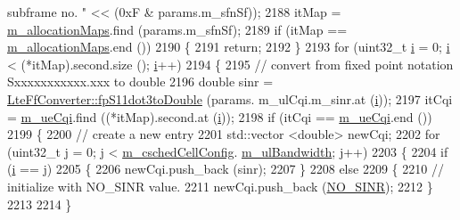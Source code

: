 \begin{DoxyCode}
{       subframe no. "} << (0xF & params.m\_sfnSf));
2188         itMap = \hyperlink{classns3_1_1FdTbfqFfMacScheduler_a5f22054304388f5f9469e3591b3bedea}{m\_allocationMaps}.find (params.m\_sfnSf);
2189         \textcolor{keywordflow}{if} (itMap == \hyperlink{classns3_1_1FdTbfqFfMacScheduler_a5f22054304388f5f9469e3591b3bedea}{m\_allocationMaps}.end ())
2190           \{
2191             \textcolor{keywordflow}{return};
2192           \}
2193         \textcolor{keywordflow}{for} (uint32\_t \hyperlink{bernuolliDistribution_8m_a6f6ccfcf58b31cb6412107d9d5281426}{i} = 0; \hyperlink{bernuolliDistribution_8m_a6f6ccfcf58b31cb6412107d9d5281426}{i} < (*itMap).second.size (); \hyperlink{bernuolliDistribution_8m_a6f6ccfcf58b31cb6412107d9d5281426}{i}++)
2194           \{
2195             \textcolor{comment}{// convert from fixed point notation Sxxxxxxxxxxx.xxx to double}
2196             \textcolor{keywordtype}{double} sinr = \hyperlink{classns3_1_1LteFfConverter_aa5d8c2a8f988dbd63da91818c18666eb}{LteFfConverter::fpS11dot3toDouble} (params.
      m\_ulCqi.m\_sinr.at (\hyperlink{bernuolliDistribution_8m_a6f6ccfcf58b31cb6412107d9d5281426}{i}));
2197             itCqi = \hyperlink{classns3_1_1FdTbfqFfMacScheduler_a74c33465af3fd4306d994e9942836a27}{m\_ueCqi}.find ((*itMap).second.at (\hyperlink{bernuolliDistribution_8m_a6f6ccfcf58b31cb6412107d9d5281426}{i}));
2198             \textcolor{keywordflow}{if} (itCqi == \hyperlink{classns3_1_1FdTbfqFfMacScheduler_a74c33465af3fd4306d994e9942836a27}{m\_ueCqi}.end ())
2199               \{
2200                 \textcolor{comment}{// create a new entry}
2201                 std::vector <double> newCqi;
2202                 \textcolor{keywordflow}{for} (uint32\_t j = 0; j < \hyperlink{classns3_1_1FdTbfqFfMacScheduler_a73d5d866713fa06e1cc6186b0f556693}{m\_cschedCellConfig}.
      \hyperlink{structns3_1_1FfMacCschedSapProvider_1_1CschedCellConfigReqParameters_a5ab5b102878e6e7e7727a14af4a64d2f}{m\_ulBandwidth}; j++)
2203                   \{
2204                     \textcolor{keywordflow}{if} (\hyperlink{bernuolliDistribution_8m_a6f6ccfcf58b31cb6412107d9d5281426}{i} == j)
2205                       \{
2206                         newCqi.push\_back (sinr);
2207                       \}
2208                     \textcolor{keywordflow}{else}
2209                       \{
2210                         \textcolor{comment}{// initialize with NO\_SINR value.}
2211                         newCqi.push\_back (\hyperlink{cqa-ff-mac-scheduler_8h_a520d71777be043568160c783a9c65fd5}{NO\_SINR});
2212                       \}
2213 
2214                   \}

\end{DoxyCode}
